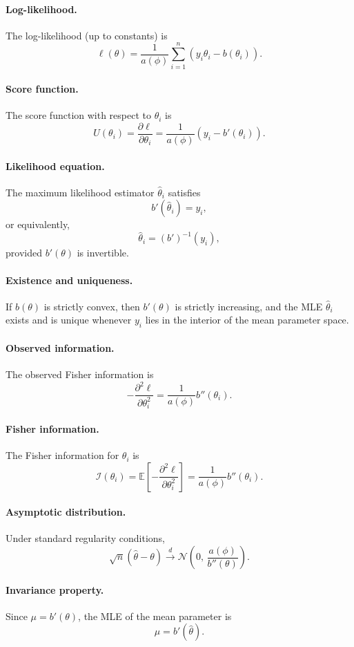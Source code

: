 \documentclass[11pt]{article}
\theoremstyle{definition}
\begin{document}
\paragraph{Log-likelihood.}
The log-likelihood (up to constants) is
\[
\ell(\theta)
=
\frac{1}{a(\phi)}
\sum_{i=1}^n
\left(
y_i\theta_i - b(\theta_i)
\right).
\]
\paragraph{Score function.}
The score function with respect to $\theta_i$ is
\[
U(\theta_i)
=
\frac{\partial \ell}{\partial \theta_i}
=
\frac{1}{a(\phi)}
\left(
y_i - b'(\theta_i)
\right).
\]
\paragraph{Likelihood equation.}
The maximum likelihood estimator $\hat\theta_i$ satisfies
\[
b'(\hat\theta_i) = y_i,
\]
or equivalently,
\[
\hat\theta_i = (b')^{-1}(y_i),
\]
provided $b'(\theta)$ is invertible.
\paragraph{Existence and uniqueness.}
If $b(\theta)$ is strictly convex, then $b'(\theta)$ is strictly increasing,
and the MLE $\hat\theta_i$ exists and is unique whenever
$y_i$ lies in the interior of the mean parameter space.
\paragraph{Observed information.}
The observed Fisher information is
\[
-\frac{\partial^2 \ell}{\partial \theta_i^2}
=
\frac{1}{a(\phi)} b''(\theta_i).
\]

\paragraph{Fisher information.}
The Fisher information for $\theta_i$ is
\[
\mathcal{I}(\theta_i)
=
\mathbb{E}\!\left[
-\frac{\partial^2 \ell}{\partial \theta_i^2}
\right]
=
\frac{1}{a(\phi)} b''(\theta_i).
\]

\paragraph{Asymptotic distribution.}
Under standard regularity conditions,
\[
\sqrt{n}(\hat\theta - \theta)
\xrightarrow{d}
\mathcal{N}\!\left(
0,\,
\frac{a(\phi)}{b''(\theta)}
\right).
\]

\paragraph{Invariance property.}
Since $\mu = b'(\theta)$, the MLE of the mean parameter is
\[
\hat\mu = b'(\hat\theta).
\]
\end{document}
